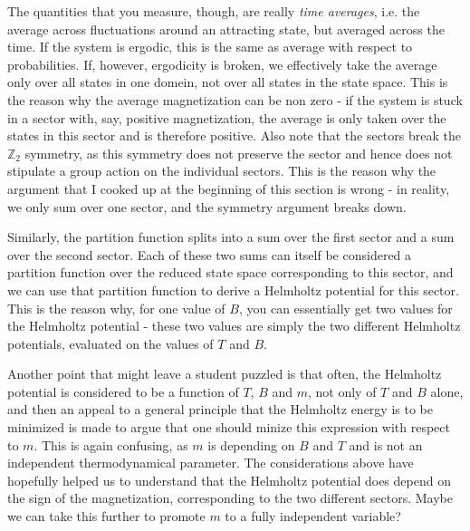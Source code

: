 \documentclass[a4paper, draft]{article}
\theoremstyle{own}
\theoremstyle{remark}
\newcommand{\Z}{\mathbb{Z}}
\begin{document}
The quantities that you measure, though, are really {\em time averages}, i.e. the average across fluctuations around an attracting state, but averaged across the time. If the system is ergodic, this is the same as average with respect to probabilities. If, however, ergodicity is broken, we effectively take the average only over all states in one domein, not over all states in the state space. This is the reason why the average magnetization can be non zero - if the system is stuck in a sector with, say, positive magnetization, the average is only taken over the states in this sector and is therefore positive. Also note that the sectors break the $\Z_2$ symmetry, as this symmetry does not preserve the sector and hence does not stipulate a group action on the individual sectors. This is the reason why the argument that I cooked up at the beginning of this section is wrong - in reality, we only sum over one sector, and the symmetry argument breaks down.

Similarly, the partition function splits into a sum over the first sector and a sum over the second sector. Each of these two sums can itself be considered a partition function over the reduced state space corresponding to this sector, and we can use that partition function to derive a Helmholtz potential for this sector. This is the reason why, for one value of $B$, you can essentially get two values for the Helmholtz potential - these two values are simply the two different Helmholtz potentials, evaluated on the  values of $T$ and $B$. 

Another point that might leave a student puzzled is that often, the Helmholtz potential is considered to be a function of $T$, $B$ and $m$, not only of $T$ and $B$ alone, and then an appeal to a general principle that the Helmholtz energy is to be minimized is made to argue that one should minize this expression with respect to $m$. This is again confusing, as $m$ is depending on $B$ and $T$ and is not an independent thermodynamical parameter. The considerations above have hopefully helped us to understand that the Helmholtz potential does depend on the sign of the magnetization, corresponding to the two different sectors. Maybe we can take this further to promote $m$ to a fully independent variable?
\end{document}
